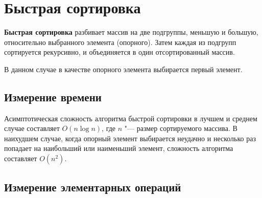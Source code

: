 \documentclass[11pt]{article}
\begin{document}
\newpage

\setcounter{section}{10}
\section*{\centering Быстрая сортировка}

\textbf{Быстрая сортировка} разбивает массив на две подгруппы, меньшую и большую,
относительно выбранного элемента (опорного). Затем каждая из подгрупп сортируется рекурсивно, и объединяется в один отсортированный массив.

В данном случае в качестве опорного элемента выбирается первый элемент.

\setcounter{subsection}{0}
\subsection{Измерение времени}

\begin{center}
\end{center}
{ \hspace*{\fill} }

\begin{center}
\end{center}
{ \hspace*{\fill} }

Асимптотическая сложность алгоритма быстрой сортировки в лучшем и среднем случае составляет $O(n\log n)$, где $n$ "--- размер сортируемого массива. В наихудшем случае, когда опорный
элемент выбирается неудачно и несколько раз попадает на наибольший или наименьший элемент, сложность алгоритма составляет $O(n^2)$.

\subsection{Измерение элементарных операций}

\begin{center}
\end{center}
{ \hspace*{\fill} }

\begin{center}
\end{center}
{ \hspace*{\fill} }
\end{document}
